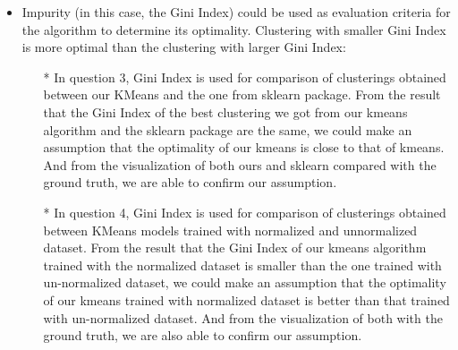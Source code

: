 \documentclass[11pt]{article}
\providecommand{\tightlist}{%
      \setlength{\itemsep}{0pt}\setlength{\parskip}{0pt}}
\begin{document}
\begin{itemize}
\tightlist
\item
  Impurity (in this case, the Gini Index) could be used as evaluation
  criteria for the algorithm to determine its optimality. Clustering with smaller Gini Index is more optimal than the clustering with larger Gini Index:

  \begin{itemize}
  \tightlist
  \item[*]
    In question 3, Gini Index is used for comparison of clusterings
    obtained between our KMeans and the one from sklearn package. From the result that the Gini Index of the best clustering we got from our kmeans algorithm and the sklearn package are the same, we could make an assumption that the optimality of our kmeans is close to that of kmeans. And from the visualization of both ours and sklearn compared with the ground truth, we are able to confirm our assumption.
  \item[*]
    In question 4, Gini Index is used for comparison of clusterings
    obtained between KMeans models trained with normalized and
    unnormalized dataset. From the result that the Gini Index of our kmeans algorithm trained with the normalized dataset is smaller than the one trained with un-normalized dataset, we could make an assumption that the optimality of our kmeans trained with normalized dataset is better than that trained with un-normalized dataset. And from the visualization of both with the ground truth, we are also able to confirm our assumption.
  \end{itemize}
\end{itemize}


    
    
    
    
\end{document}
